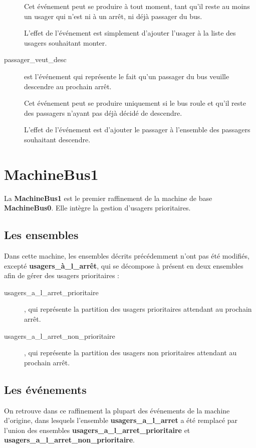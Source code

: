 ﻿\documentclass[a4paper,titlepage]{report}
\begin{document}
\begin{description}
			Cet événement peut se produire à tout moment, tant qu'il reste au moins un usager qui n'est ni à un arrêt, ni déjà passager du bus.
			
			L'effet de l'événement est simplement d'ajouter l'usager à la liste des usagers souhaitant monter.\\
			
			\item[passager\_veut\_desc] est l'événement qui représente le fait qu'un passager du bus veuille descendre au prochain arrêt.
			
			Cet événement peut se produire uniquement si le bus roule et qu'il reste des passagers n'ayant pas déjà décidé de descendre.
			
			L'effet de l'événement est d'ajouter le passager à l'ensemble des passagers souhaitant descendre.\\
		\end{description}
		
\section{MachineBus1}
	La \textbf{MachineBus1} est le premier raffinement de la machine de base \textbf{MachineBus0}. Elle intègre la gestion d'usagers prioritaires.\\
		
	\subsection{Les ensembles}
		Dans cette machine, les ensembles décrits précédemment n'ont pas été modifiés, excepté \textbf{usagers\_à\_l\_arrêt}, qui se décompose à présent en deux ensembles afin de gérer des usagers prioritaires :
		 	
		\begin{description}
			\item[usagers\_a\_l\_arret\_prioritaire], qui représente la partition des usagers prioritaires attendant au prochain arrêt.
			\item[usagers\_a\_l\_arret\_non\_prioritaire], qui représente la partition des usagers non prioritaires attendant au prochain arrêt.\\
		\end{description}
				
	\subsection{Les événements}
		On retrouve dans ce raffinement la plupart des événements de la machine d'origine, dans lesquels l'ensemble \textbf{usagers\_a\_l\_arret} a été remplacé par l'union des ensembles \textbf{usagers\_a\_l\_arret\_prioritaire} et \textbf{usagers\_a\_l\_arret\_non\_prioritaire}.\\
		
\end{document}
